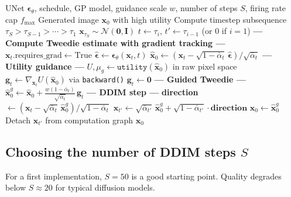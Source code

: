 \documentclass[11pt]{article}
\newcommand{\xb}{\mathbf{x}}
\newcommand{\eb}{\boldsymbol{\epsilon}}
\newcommand{\gb}{\mathbf{g}}
\newcommand{\Ib}{\mathbf{I}}
\newcommand{\alphabar}{\bar{\alpha}}
\begin{document}
\begin{algorithm}[H]
\caption{Guided DDIM (Deterministic, $\sigma = 0$)}
\label{alg:guided_ddim}
\begin{algorithmic}[1]
\Require UNet $\eb_\theta$, schedule, GP model, guidance scale $w$,
         number of steps $S$, firing rate cap $f_{\max}$
\Ensure Generated image $\xb_0$ with high utility
\State Compute timestep subsequence $\tau_S > \tau_{S-1} > \cdots > \tau_1$
\State $\xb_{\tau_S} \sim \mathcal{N}(\mathbf{0}, \Ib)$
    \State $t \gets \tau_i$, \quad $t' \gets \tau_{i-1}$ (or $0$ if $i = 1$)
    \Statex
    \State \textbf{--- Compute Tweedie estimate with gradient tracking ---}
    \State $\xb_t.\text{requires\_grad} \gets \text{True}$
    \State $\hat{\eb} \gets \eb_\theta(\xb_t, t)$
    \State $\hat{\xb}_0 \gets (\xb_t - \sqrt{1-\alphabar_t}\,\hat{\eb}) / \sqrt{\alphabar_t}$
    \Statex
    \State \textbf{--- Utility guidance ---}
    \State $U, \mu_g \gets \texttt{utility}(\hat{\xb}_0)$ in raw pixel space
        \State $\gb_t \gets \nabla_{\xb_t} U(\hat{\xb}_0)$ via \texttt{backward()}
    \Else
        \State $\gb_t \gets \mathbf{0}$
    \EndIf
    \Statex
    \State \textbf{--- Guided Tweedie ---}
    \State $\hat{\xb}_0^g \gets \hat{\xb}_0 + \frac{w(1-\alphabar_t)}{\sqrt{\alphabar_t}}\,\gb_t$
    \Statex
    \State \textbf{--- DDIM step ---}
    \State \textbf{direction} $\gets (\xb_t - \sqrt{\alphabar_t}\,\hat{\xb}_0^g) / \sqrt{1-\alphabar_t}$
        \State $\xb_{t'} \gets \sqrt{\alphabar_{t'}}\,\hat{\xb}_0^g
            + \sqrt{1-\alphabar_{t'}}\cdot\textbf{direction}$
    \Else
        \State $\xb_0 \gets \hat{\xb}_0^g$
    \EndIf
    \State Detach $\xb_{t'}$ from computation graph
\EndFor
\State \Return $\xb_0$
\end{algorithmic}
\end{algorithm}

\subsection{Choosing the number of DDIM steps $S$}

For a first implementation, $S = 50$ is a good starting point.
Quality degrades below $S \approx 20$ for typical diffusion models.
\end{document}
